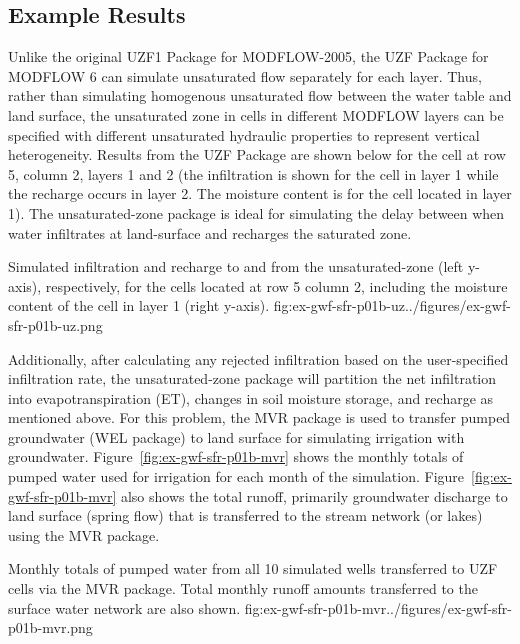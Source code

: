 \subsection{Example Results}

Unlike the original UZF1 Package \citep{UZF} for MODFLOW-2005, the UZF Package for MODFLOW 6 can simulate unsaturated flow separately for each layer. Thus, rather than simulating homogenous unsaturated flow between the water table and land surface, the unsaturated zone in cells in different MODFLOW layers can be specified with different unsaturated hydraulic properties to represent vertical heterogeneity. Results from the UZF Package are shown below for the cell at row 5, column 2, layers 1 and 2 (the infiltration is shown for the cell in layer 1 while the recharge occurs in layer 2.  The moisture content is for the cell located in layer 1).  The unsaturated-zone package is ideal for simulating the delay between when water infiltrates at land-surface and recharges the saturated zone.  

\begin{StandardFigure}
	{Simulated infiltration and recharge to and from the unsaturated-zone (left y-axis), respectively, for the cells located at row 5 column 2, including the moisture content of the cell in layer 1 (right y-axis).}
	{fig:ex-gwf-sfr-p01b-uz}{../figures/ex-gwf-sfr-p01b-uz.png}
\end{StandardFigure}

Additionally, after calculating any rejected infiltration based on the user-specified infiltration rate, the unsaturated-zone package will partition the net infiltration into evapotranspiration (ET), changes in soil moisture storage, and recharge as mentioned above.  For this problem, the MVR package is used to transfer pumped groundwater (WEL package) to land surface for simulating irrigation with groundwater.  Figure~\ref{fig:ex-gwf-sfr-p01b-mvr} shows the monthly totals of pumped water used for irrigation for each month of the simulation.  Figure~\ref{fig:ex-gwf-sfr-p01b-mvr} also shows the total runoff, primarily groundwater discharge to land surface (spring flow) that is transferred to the stream network (or lakes) using the MVR package.

\begin{StandardFigure}
	{Monthly totals of pumped water from all 10 simulated wells transferred to UZF cells via the MVR package.  Total monthly runoff amounts transferred to the surface water network are also shown.}
	{fig:ex-gwf-sfr-p01b-mvr}{../figures/ex-gwf-sfr-p01b-mvr.png}
\end{StandardFigure}

